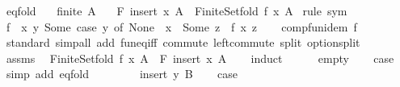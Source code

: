 \begin{isabellebody}
\ eq{\isacharunderscore}{\kern0pt}fold{\isacharcolon}{\kern0pt}\isanewline
\ \ \ {\isachardoublequoteopen}finite\ A{\isachardoublequoteclose}\isanewline
\ \ \ {\isachardoublequoteopen}F\ {\isacharparenleft}{\kern0pt}insert\ x\ A{\isacharparenright}{\kern0pt}\ {\isacharequal}{\kern0pt}\ Finite{\isacharunderscore}{\kern0pt}Set{\isachardot}{\kern0pt}fold\ f\ x\ A{\isachardoublequoteclose}\isanewline
%
\isadelimproof
%
\endisadelimproof
%
\isatagproof
{}\isamarkupfalse%
\ {\isacharparenleft}{\kern0pt}rule\ sym{\isacharparenright}{\kern0pt}\isanewline
\ \ \isamarkupfalse%
\ {\isacharquery}{\kern0pt}f\ {\isacharequal}{\kern0pt}\ {\isachardoublequoteopen}{\isasymlambda}x\ y{\isachardot}{\kern0pt}\ Some\ {\isacharparenleft}{\kern0pt}case\ y\ of\ None\ {\isasymRightarrow}\ x\ {\isacharbar}{\kern0pt}\ Some\ z\ {\isasymRightarrow}\ f\ x\ z{\isacharparenright}{\kern0pt}{\isachardoublequoteclose}\isanewline
\ \ \isamarkupfalse%
\ comp{\isacharunderscore}{\kern0pt}fun{\isacharunderscore}{\kern0pt}idem\ {\isachardoublequoteopen}{\isacharquery}{\kern0pt}f{\isachardoublequoteclose}\isanewline
\ \ \ \ \isamarkupfalse%
\ standard\ {\isacharparenleft}{\kern0pt}simp{\isacharunderscore}{\kern0pt}all\ add{\isacharcolon}{\kern0pt}\ fun{\isacharunderscore}{\kern0pt}eq{\isacharunderscore}{\kern0pt}iff\ commute\ left{\isacharunderscore}{\kern0pt}commute\ split{\isacharcolon}{\kern0pt}\ option{\isachardot}{\kern0pt}split{\isacharparenright}{\kern0pt}\isanewline
\ \ \isamarkupfalse%
\ assms\ \isamarkupfalse%
\ {\isachardoublequoteopen}Finite{\isacharunderscore}{\kern0pt}Set{\isachardot}{\kern0pt}fold\ f\ x\ A\ {\isacharequal}{\kern0pt}\ F\ {\isacharparenleft}{\kern0pt}insert\ x\ A{\isacharparenright}{\kern0pt}{\isachardoublequoteclose}\isanewline
\ \ \isamarkupfalse%
\ induct\isanewline
\ \ \ \ \isamarkupfalse%
\ empty\ \isamarkupfalse%
\ \isamarkupfalse%
\ {\isacharquery}{\kern0pt}case\ \isamarkupfalse%
\ {\isacharparenleft}{\kern0pt}simp\ add{\isacharcolon}{\kern0pt}\ eq{\isacharunderscore}{\kern0pt}fold{\isacharprime}{\kern0pt}{\isacharparenright}{\kern0pt}\isanewline
\ \ \isamarkupfalse%
\isanewline
\ \ \ \ \isamarkupfalse%
\ {\isacharparenleft}{\kern0pt}insert\ y\ B{\isacharparenright}{\kern0pt}\ \isamarkupfalse%
\ \isamarkupfalse%
\ {\isacharquery}{\kern0pt}case\ \isamarkupfalse%

\end{isabellebody}
